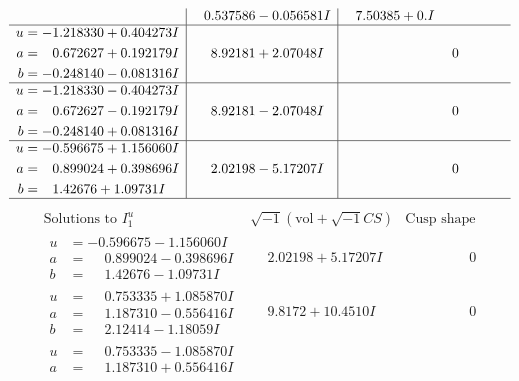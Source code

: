 \documentclass[1p]{elsarticle_modified}
\theoremstyle{definition}
\newcommand{\I}{\sqrt{-1}}
\begin{document}
$$\begin{array}{c|c|c}
 & \phantom{-}0.537586 - 0.056581 I & \phantom{-}7.50385 + 0. I\phantom{ +0.000000I} \\ \hline\begin{aligned}
u &= -1.218330 + 0.404273 I \\
a &= \phantom{-}0.672627 + 0.192179 I \\
b &= -0.248140 - 0.081316 I\end{aligned}
 & \phantom{-}8.92181 + 2.07048 I & \phantom{-0.000000 } 0 \\ \hline\begin{aligned}
u &= -1.218330 - 0.404273 I \\
a &= \phantom{-}0.672627 - 0.192179 I \\
b &= -0.248140 + 0.081316 I\end{aligned}
 & \phantom{-}8.92181 - 2.07048 I & \phantom{-0.000000 } 0 \\ \hline\begin{aligned}
u &= -0.596675 + 1.156060 I \\
a &= \phantom{-}0.899024 + 0.398696 I \\
b &= \phantom{-}1.42676 + 1.09731 I\end{aligned}
 & \phantom{-}2.02198 - 5.17207 I & \phantom{-0.000000 } 0\\
 \hline 
 \end{array}$$\newpage$$\begin{array}{c|c|c}  
\text{Solutions to }I^u_{1}& \I (\text{vol} + \sqrt{-1}CS) & \text{Cusp shape}\\
 \hline 
\begin{aligned}
u &= -0.596675 - 1.156060 I \\
a &= \phantom{-}0.899024 - 0.398696 I \\
b &= \phantom{-}1.42676 - 1.09731 I\end{aligned}
 & \phantom{-}2.02198 + 5.17207 I & \phantom{-0.000000 } 0 \\ \hline\begin{aligned}
u &= \phantom{-}0.753335 + 1.085870 I \\
a &= \phantom{-}1.187310 - 0.556416 I \\
b &= \phantom{-}2.12414 - 1.18059 I\end{aligned}
 & \phantom{-}9.8172 + 10.4510 I & \phantom{-0.000000 } 0 \\ \hline\begin{aligned}
u &= \phantom{-}0.753335 - 1.085870 I \\
a &= \phantom{-}1.187310 + 0.556416 I \\

\end{aligned}
\end{array}$$
\end{document}
